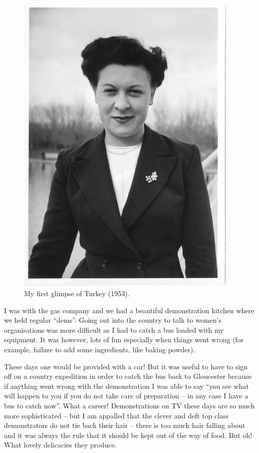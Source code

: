 \begin{figure}
  \centering
  \includegraphics[width=0.95\textwidth]{photos/madge-adult.jpg}
  \caption{My first glimpse of Turkey (1953).}
  \label{madge-adult}
\end{figure}

I was with the gas company and we had a beautiful demonstration
kitchen where we held regular ``dems''. Going out into the country to
talk to women's organisations was more difficult as I had to catch a
bus loaded with my equipment. It was however, lots of fun especially
when things went wrong (for example, failure to add some ingredients,
like baking powder).

These days one would be provided with a car! But it was useful to have
to sign off on a country expedition in order to catch the bus back to
Gloucester because if anything went wrong with the demonstration I was
able to say ``you see what will happen to you if you do not take care
of preparation -- in any case I have a bus to catch now''. What a
career! Demonstrations on TV these days are so much more sophisticated
-- but I am appalled that the clever and deft top class demonstrators
do not tie back their hair -- there is too much hair falling about and
it was always the rule that it should be kept out of the way of
food. But oh! What lovely delicacies they produce.

